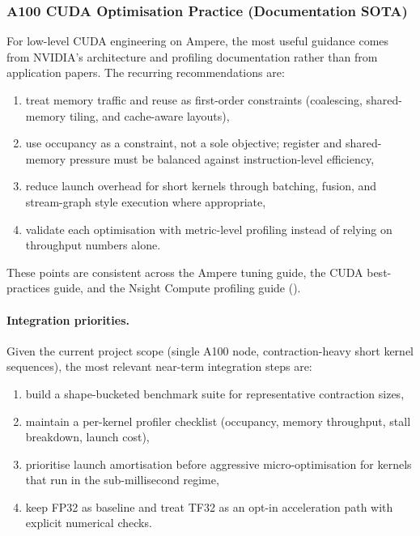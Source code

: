 \subsubsection{A100 CUDA Optimisation Practice (Documentation SOTA)}

For low-level CUDA engineering on Ampere, the most useful guidance comes
from NVIDIA's architecture and profiling documentation rather than from
application papers. The recurring recommendations are:
\begin{enumerate}
  \item treat memory traffic and reuse as first-order constraints
    (coalescing, shared-memory tiling, and cache-aware layouts),
  \item use occupancy as a constraint, not a sole objective; register and
    shared-memory pressure must be balanced against instruction-level
    efficiency,
  \item reduce launch overhead for short kernels through batching, fusion, and
    stream-graph style execution where appropriate,
  \item validate each optimisation with metric-level profiling instead of
    relying on throughput numbers alone.
\end{enumerate}
These points are consistent across the Ampere tuning guide, the CUDA
best-practices guide, and the Nsight Compute profiling guide
(\cite{nvidia-ampere-tuning-guide,nvidia-cuda-best-practices,nvidia-nsight-compute-profiling-guide}).

\paragraph{Integration priorities.}
Given the current project scope (single A100 node, contraction-heavy short
kernel sequences), the most relevant near-term integration steps are:
\begin{enumerate}
  \item build a shape-bucketed benchmark suite for representative contraction
    sizes,
  \item maintain a per-kernel profiler checklist (occupancy, memory throughput,
    stall breakdown, launch cost),
  \item prioritise launch amortisation before aggressive micro-optimisation for
    kernels that run in the sub-millisecond regime,
  \item keep FP32 as baseline and treat TF32 as an opt-in acceleration path
    with explicit numerical checks.
\end{enumerate}

